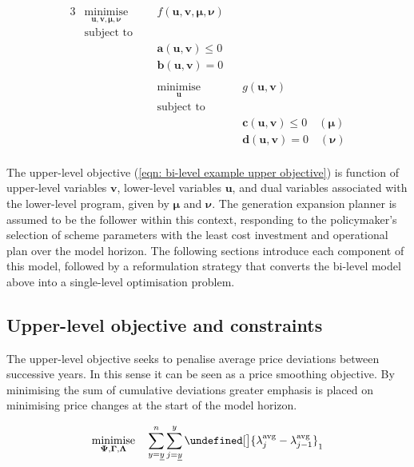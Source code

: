 \documentclass{article}
\let\norm\undefined %
\DeclarePairedDelimiter\norm{\lVert}{\rVert}
\DeclareMathOperator*{\minimise}{minimise}
\begin{document}
\begin{alignat}{3}
& \minimise\limits_{\bm{u}, \bm{v}, \bm{\mu}, \bm{\nu}} \quad && f\left(\bm{u}, \bm{v}, \bm{\mu}, \bm{\nu}\right) \label{eqn: bi-level example upper objective}\\
& \textrm{subject to} \nonumber\\
& && \bm{a}(\bm{u}, \bm{v}) \leq 0\\
& && \bm{b}(\bm{u}, \bm{v}) = 0\\
&\nonumber \\
& && \minimise\limits_{\bm{u}} \quad && g(\bm{u}, \bm{v}) \nonumber\\
& && \textrm{subject to} \nonumber\\
& && && \bm{c}(\bm{u}, \bm{v}) \leq 0 \quad \left(\bm{\mu}\right) \\
& && && \bm{d}(\bm{u}, \bm{v}) = 0 \quad \left(\bm{\nu}\right)\\\nonumber
\end{alignat}

The upper-level objective (\ref{eqn: bi-level example upper objective}) is function of upper-level variables $\bm{v}$, lower-level variables $\bm{u}$, and dual variables associated with the lower-level program, given by $\bm{\mu}$ and $\bm{\nu}$. The generation expansion planner is assumed to be the follower within this context, responding to the policymaker's selection of scheme parameters with the least cost investment and operational plan over the model horizon. The following sections introduce each component of this model, followed by a reformulation strategy that converts the bi-level model above into a single-level optimisation problem.

\subsection{Upper-level objective and constraints}
The upper-level objective seeks to penalise average price deviations between successive years. In this sense it can be seen as a price smoothing objective. By minimising the sum of cumulative deviations greater emphasis is placed on minimising price changes at the start of the model horizon.

\begin{equation}
	\minimise\limits_{\bm{\Psi}, \bm{\Gamma}, \bm{\Lambda}} \quad \sum\limits_{\iYear=\iYearStart}^{\iYearTransition} \sum\limits_{\iYearAlias=\iYearStart}^{\iYear} \norm[\big]{\dAveragePrice[\iYearAlias] - \dAveragePrice[\iYearAlias-1]}_{1}
	\label{eqn: upper-level objective}
\end{equation}
\end{document}
